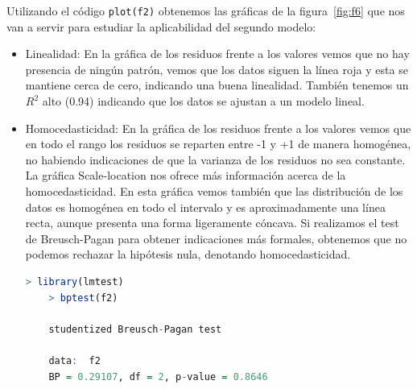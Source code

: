\documentclass[a4paper]{article}
\begin{document}
Utilizando el código \verb|plot(f2)| obtenemos las gráficas de la figura~\ref{fig:f6} que nos van a servir para estudiar la aplicabilidad del segundo modelo: \par
\begin{itemize}

    \item Linealidad: En la gráfica de los residuos frente a los valores vemos que no hay presencia de ningún patrón, vemos que los datos siguen la línea roja y esta se mantiene cerca de cero, indicando una buena linealidad.
    También tenemos un $R^2$ alto (0.94) indicando que los datos se ajustan a un modelo lineal.
    \item Homocedasticidad: En la gráfica de los residuos frente a los valores vemos que en todo el rango los residuos se reparten entre -1 y +1 de manera homogénea, no habiendo indicaciones de que la varianza de los residuos no sea constante. La gráfica Scale-location nos ofrece más información acerca de la homocedasticidad. En esta gráfica vemos también que las distribución de los datos es homogénea en todo el intervalo y es aproximadamente una línea recta, aunque presenta una forma ligeramente cóncava. Si realizamos el test de Breusch-Pagan para obtener indicaciones más formales, obtenemos que no podemos rechazar la hipótesis nula, denotando homocedasticidad.
    \begin{lstlisting}[language=R]
    > library(lmtest)
    > bptest(f2)

	studentized Breusch-Pagan test

    data:  f2
    BP = 0.29107, df = 2, p-value = 0.8646
    \end{lstlisting}


\end{itemize}
\end{document}
